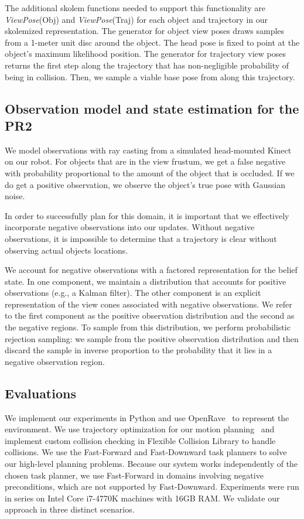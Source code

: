 The additional skolem functions needed to support this functionality
are \emph{ViewPose}(Obj) and \emph{ViewPose}(Traj) for each object and
trajectory in our skolemized representation. The generator for object
view poses draws samples from a 1-meter unit disc around the
object. The head pose is fixed to point at the object's maximum
likelihood position. The generator for trajectory view poses returns
the first step along the trajectory that has non-negligible probability of being
in collision. Then, we sample a viable base pose from along this trajectory.

\subsection{Observation model and state estimation for the PR2}
We model observations with ray casting from a simulated head-mounted
Kinect on our robot. For objects that are in the view
frustum, we get a false negative with probability proportional to the
amount of the object that is occluded. If we do get a positive
observation, we observe the object's true pose with Gaussian noise.


In order to successfully plan for this domain, it is important that we
effectively incorporate negative observations into our
updates. Without negative observations, it is impossible to determine
that a trajectory is clear without observing actual objects
locations. 

We account for negative observations with a factored representation for
the belief state. In one component, we maintain a distribution that
accounts for positive observations (e.g., a Kalman filter). The other component is an explicit
representation of the view cones associated with negative
observations. We refer to the first component as the positive
observation distribution and the second as the negative regions. To
sample from this distribution, we perform probabilistic rejection sampling:
we sample from the positive observation distribution and then discard
the sample in inverse proportion to the probability that it lies in a
negative observation region.


\subsection{Evaluations}
We implement our experiments in Python and use
OpenRave~\cite{Diankov_2008_6117} to represent the environment. We use
trajectory optimization for our motion planning~\cite{schulman2013finding}
and implement custom collision checking in Flexible Collision Library to handle
collisions. We use the Fast-Forward and Fast-Downward
task planners to solve our high-level planning problems. Because our system works
independently of the chosen task planner, we use Fast-Forward in domains involving negative
preconditions, which are not supported by Fast-Downward. Experiments were run in series on
Intel Core i7-4770K machines with 16GB RAM. We validate our approach in three distinct scenarios.

